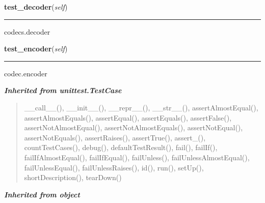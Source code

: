     \vspace{0.5ex}

\hspace{.8\funcindent}\begin{boxedminipage}{\funcwidth}

    \raggedright \textbf{test\_decoder}(\textit{self})

    \vspace{-1.5ex}

    \rule{\textwidth}{0.5\fboxrule}
\setlength{\parskip}{2ex}
    codecs.decoder

\setlength{\parskip}{1ex}
    \end{boxedminipage}

    \label{cssutils:tests:test_codec:CodecTestCase:test_encoder}

    \vspace{0.5ex}

\hspace{.8\funcindent}\begin{boxedminipage}{\funcwidth}

    \raggedright \textbf{test\_encoder}(\textit{self})

    \vspace{-1.5ex}

    \rule{\textwidth}{0.5\fboxrule}
\setlength{\parskip}{2ex}
    codec.encoder

\setlength{\parskip}{1ex}
    \end{boxedminipage}


\large{\textbf{\textit{Inherited from unittest.TestCase}}}

\begin{quote}
\_\_call\_\_(), \_\_init\_\_(), \_\_repr\_\_(), \_\_str\_\_(), assertAlmostEqual(), assertAlmostEquals(), assertEqual(), assertEquals(), assertFalse(), assertNotAlmostEqual(), assertNotAlmostEquals(), assertNotEqual(), assertNotEquals(), assertRaises(), assertTrue(), assert\_(), countTestCases(), debug(), defaultTestResult(), fail(), failIf(), failIfAlmostEqual(), failIfEqual(), failUnless(), failUnlessAlmostEqual(), failUnlessEqual(), failUnlessRaises(), id(), run(), setUp(), shortDescription(), tearDown()
\end{quote}

\large{\textbf{\textit{Inherited from object}}}

